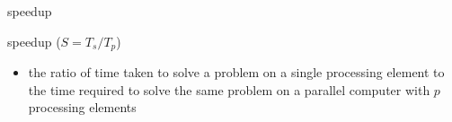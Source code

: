 \documentclass[10pt, t]{beamer}
\begin{document}
  \begin{frame}{speedup}
    \begin{block}{speedup ($S=T_s/T_p$)}
      \begin{itemize}
        \item the ratio of time taken to solve a problem on a single processing
          element to the time required to solve the same problem on a parallel
          computer with $p$ processing elements
      \end{itemize}
    \end{block}

    \vspace{-2ex}
    \begin{center}
    \end{center}
  \end{frame}
\end{document}
